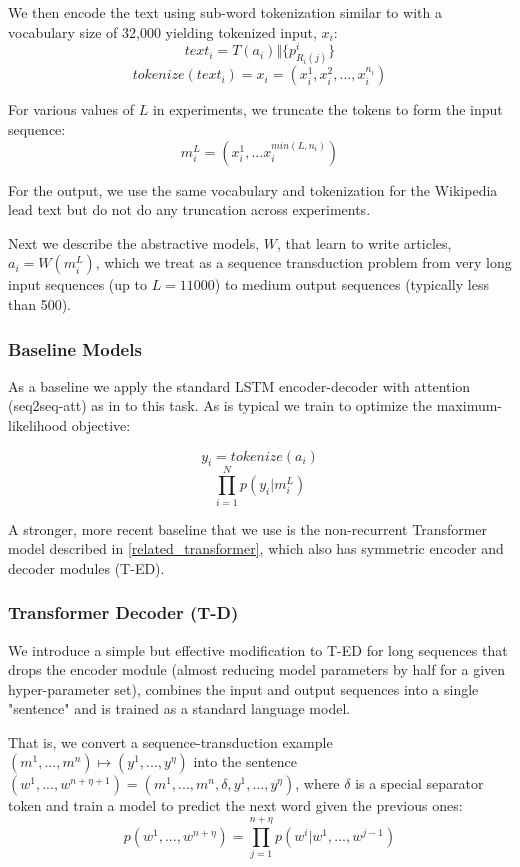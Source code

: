 We then encode the text using sub-word tokenization similar to \citet{wu2016google}
with a vocabulary size of 32,000 yielding tokenized input, $x_i$:
   \[ text_i = T(a_i) \Vert \{p^i_{R_i(j)}\}  \]
 \[ tokenize(text_i) = x_i = (x_i^1, x_i^2, ..., x_i^{n_i}) \]

For various values of $L$ in experiments, we truncate the tokens to form the input sequence:
  \[ m^L_i = (x_i^1, ... x_i^{min(L, n_i)}) \]

For the output, we use the same vocabulary and tokenization for the Wikipedia
lead text but do not do any truncation across experiments.

Next we describe the abstractive models, $W$, that learn to write articles, $a_i = W(m^L_i)$,
which we treat as a sequence transduction problem from very long input sequences
(up to $L=11000$) to medium output sequences (typically less than 500).

\subsubsection{Baseline Models}

As a baseline we apply the standard LSTM encoder-decoder with
attention (seq2seq-att) as in \cite{bahdanau2014neural} to this task.
As is typical we train to optimize the maximum-likelihood objective:

\[ y_i = tokenize(a_i) \]
\[\prod_{i=1}^{N}p(y_i | m^L_i) \]

A stronger, more recent baseline that we use is the non-recurrent
Transformer model described in \ref{related_transformer}, which also has symmetric
encoder and decoder modules (T-ED).

\subsubsection{Transformer Decoder (T-D)}
We introduce a simple but effective modification to T-ED for long sequences
that drops the encoder module (almost reducing model parameters by half for a given
hyper-parameter set), combines the input and output
sequences into a single "sentence" and is trained as a standard language model. 

That is, we convert a sequence-transduction example $(m^1, ..., m^n) \mapsto (y^1, ..., y^\eta)$ into
the sentence $(w^1, ..., w^{n+\eta+1}) = (m^1, ..., m^n, \delta, y^1, ..., y^\eta)$, where $\delta$ is a special separator token
 and train a model to predict the next word given the previous ones:
 \[p(w^1, ..., w^{n+\eta}) = \prod_{j=1}^{n+\eta} p(w^i | w^1, ..., w^{j-1}) \]

